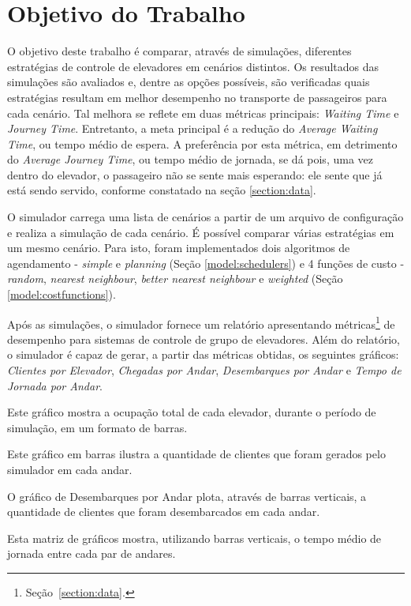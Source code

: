 \chapter{\label{chap:objectives}Objetivo do Trabalho}

O objetivo deste trabalho é comparar, através de simulações, diferentes
estratégias de controle de elevadores em cenários distintos. Os resultados das
simulações são avaliados e, dentre as opções possíveis, são verificadas quais
estratégias resultam em melhor desempenho no transporte de passageiros para cada
cenário. Tal melhora se reflete em duas métricas principais: \textit{Waiting
Time} e \textit{Journey Time}. Entretanto, a meta principal é a redução do
\textit{Average Waiting Time}, ou tempo médio de espera. A preferência por esta
métrica, em detrimento do \textit{Average Journey Time}, ou tempo médio de
jornada, se dá pois, uma vez dentro do elevador, o passageiro não se sente mais
esperando: ele sente que já está sendo servido, conforme constatado na seção
\ref{section:data}.

O simulador carrega uma lista de cenários a partir de um arquivo de configuração
e realiza a simulação de cada cenário. É possível comparar várias estratégias em
um mesmo cenário. Para isto, foram implementados dois algoritmos de agendamento
- \textit{simple} e \textit{planning} (Seção \ref{model:schedulers}) e 4 funções
de custo - \textit{random}, \textit{nearest neighbour}, \textit{better nearest
neighbour} e \textit{weighted} (Seção \ref{model:costfunctions}).

Após as simulações, o simulador fornece um relatório apresentando
métricas\footnote{Seção~\ref{section:data}.} de desempenho para sistemas de
controle de grupo de elevadores. Além do relatório, o simulador é capaz de
gerar, a partir das métricas obtidas, os seguintes gráficos: \textit{Clientes
por Elevador}, \textit{Chegadas por Andar}, \textit{Desembarques por Andar} e
\textit{Tempo de Jornada por Andar}.

\begin{description}[leftmargin=!,labelwidth=\widthof{\bfseries Tempo de Jornada por Andar}]\setlength\itemsep{0mm}
  \item[Clientes por Elevador]
    Este gráfico mostra a ocupação total de cada elevador, durante o período de
    simulação, em um formato de barras.
  \item[Chegadas por Andar]
    Este gráfico em barras ilustra a quantidade de clientes que foram gerados pelo
    simulador em cada andar.
  \item[Desembarques por Andar]
    O gráfico de Desembarques por Andar plota, através de barras verticais, a
    quantidade de clientes que foram desembarcados em cada andar.
  \item[Tempo de Jornada por Andar]
    Esta matriz de gráficos mostra, utilizando barras verticais, o tempo médio de
    jornada entre cada par de andares.
\end{description}

